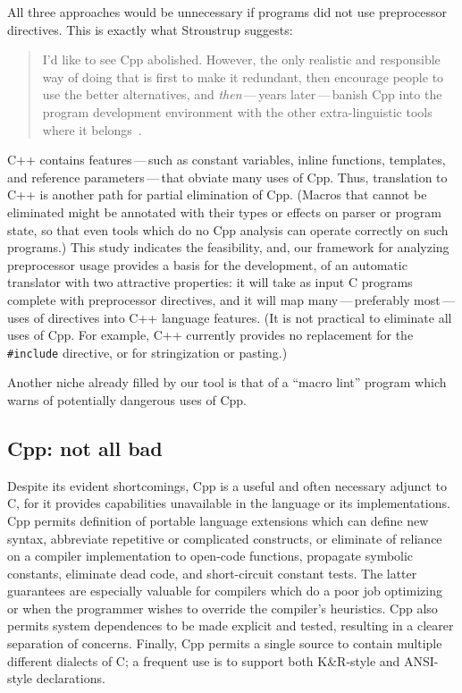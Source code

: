 \documentclass[11pt]{article}
\begin{document}
All three approaches would be unnecessary if programs did not use
preprocessor directives.  This is exactly what Stroustrup suggests:
\begin{quote}
  I'd like to see Cpp abolished.  However, the only realistic and
  responsible way of doing that is first to make it redundant, then
  encourage people to use the better alternatives, and {\em then\/}\,---\,years
  later\,---\,banish Cpp into the program development environment with the
  other extra-linguistic tools where it
  belongs~\cite[p.~426]{Stroustrup-DesignEvolution}.
\end{quote}
C++ contains features\,---\,such as constant variables, inline functions,
templates, and reference parameters\,---\,that obviate many uses of Cpp.  Thus,
translation to C++ is another path for partial elimination of Cpp.  (Macros
that cannot be eliminated might be annotated with their types or effects on
parser or program state, so that even tools which do no Cpp analysis can
operate correctly on such programs.)  This study indicates the feasibility,
and, our framework for analyzing preprocessor usage provides a basis for
the development, of an automatic translator with two attractive properties:
it will take as input C programs complete with preprocessor directives, and
it will map many\,---\,preferably most\,---\,uses of directives into C++ language
features.  (It is not practical to eliminate all uses of Cpp.  For example,
C++ currently provides no replacement for the {\tt \#include} directive, or
for stringization or pasting.)

Another niche already filled by our tool is that of a ``macro lint''
program which warns of potentially dangerous uses of Cpp.


\subsection{Cpp: not all bad}

Despite its evident shortcomings, Cpp is a useful and often necessary
adjunct to C, for it provides capabilities unavailable in the language or
its implementations.  Cpp permits definition of portable language
extensions which can define new syntax, abbreviate repetitive or
complicated constructs, or eliminate of reliance on a compiler
implementation to open-code functions, propagate symbolic constants,
eliminate dead code, and short-circuit constant tests.  The latter
guarantees are especially valuable for compilers which do a poor job
optimizing or when the programmer wishes to override the compiler's
heuristics.  Cpp also permits system dependences to be made explicit and
tested, resulting in a clearer separation of concerns.  Finally, Cpp
permits a single source to contain multiple different dialects of C; a
frequent use is to support both K\&R-style and ANSI-style declarations.
\end{document}
